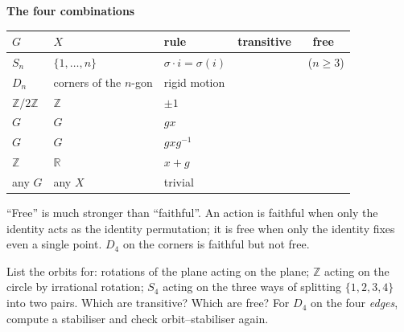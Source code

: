 \documentclass[10pt]{article}
\newcommand{\cmark}{\textcolor{why}{\ding{51}}}
\newcommand{\xmark}{\textcolor{pit}{\ding{55}}}
\newcommand{\Z}{\mathbb{Z}}
\newcommand{\R}{\mathbb{R}}
\newcommand{\inv}{^{-1}}
\begin{document}
{\begin{minipage}[t]{744pt}
\begin{minipage}[t]{372pt}
{
}\par\vspace{3pt}
{\sffamily\bfseries\color{big} The four combinations}\par\vspace{2pt}
\centering
\begin{tabular}{@{}lllcc@{}}
\toprule
$G$ & $X$ & rule & transitive & free\\
\midrule
$S_n$ & $\{1,\dots,n\}$ & $\sigma\cdot i=\sigma(i)$ & \cmark & \xmark\ ($n\ge3$)\\
$D_n$ & corners of the $n$-gon & rigid motion & \cmark & \xmark\\
$\Z/2\Z$ & $\Z$ & $\pm1$ & \xmark & \xmark\\
$G$ & $G$ & $gx$ & \cmark & \cmark\\
$G$ & $G$ & $gxg\inv$ & \xmark & \xmark\\
$\Z$ & $\R$ & $x+g$ & \xmark & \cmark\\
any $G$ & any $X$ & trivial & \xmark & \xmark\\
\bottomrule
\end{tabular}\par\vspace{3pt}
\raggedright
\begin{pitfall}
``Free'' is much stronger than ``faithful''. An action is faithful when only the identity acts as the identity permutation; it is free when only the identity fixes even a single point. $D_4$ on the corners is faithful but not free.
\end{pitfall}
\begin{tryit}
List the orbits for: rotations of the plane acting on the plane; $\Z$ acting on the circle by irrational rotation; $S_4$ acting on the three ways of splitting $\{1,2,3,4\}$ into two pairs. Which are transitive? Which are free? For $D_4$ on the four \emph{edges}, compute a stabiliser and check orbit--stabiliser again.
\end{tryit}
\end{minipage}
\end{minipage}
}
\end{document}
